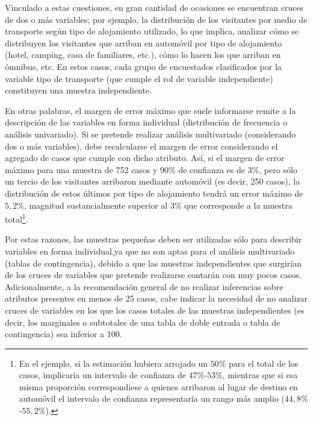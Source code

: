 \documentclass[
]{book}
\begin{document}
Vinculado a estas cuestiones, en gran cantidad de ocasiones se encuentran cruces de dos o más variables; por ejemplo, la distribución de los visitantes por medio de transporte según tipo de alojamiento utilizado, lo que implica, analizar cómo se distribuyen los visitantes que arriban en automóvil por tipo de alojamiento (hotel, camping, casa de familiares, etc.), cómo lo hacen los que arriban en ómnibus, etc. En estos casos, cada grupo de encuestados clasificados por la variable tipo de transporte (que cumple el rol de variable independiente) constituyen una muestra independiente.

En otras palabras, el margen de error máximo que suele informarse remite a la descripción de las variables en forma individual (distribución de frecuencia o análisis univariado). Si se pretende realizar análisis multivariado (considerando dos o más variables), debe recalcularse el margen de error considerando el agregado de casos que cumple con dicho atributo. Así, si el margen de error máximo para una muestra de 752 casos y \(90\%\) de confianza es de \(3\%\), pero sólo un tercio de los visitantes arribaron mediante automóvil (es decir, 250 casos), la distribución de estos últimos por tipo de alojamiento tendrá un error máximo de \(5,2\%\), magnitud sustancialmente superior al \(3\%\) que corresponde a la muestra total\footnote{En el ejemplo, si la estimación hubiera arrojado un \(50\%\) para el total de los casos, implicaría un intervalo de confianza de \(47\%\)-\(53\%\), mientras que si esa misma proporción correspondiese a quienes arribaron al lugar de destino en automóvil el intervalo de confianza representaría un rango más amplio (\(44,8\%\)-\(55,2\%\)).}.

Por estas razones, las muestras pequeñas deben ser utilizadas sólo para describir variables en forma individual,ya que no son aptas para el análisis multivariado (tablas de contingencia), debido a que las muestras independientes que surgirían de los cruces de variables que pretende realizarse contarán con muy pocos casos. Adicionalmente, a la recomendación general de no realizar inferencias sobre atributos presentes en menos de 25 casos, cabe indicar la necesidad de no analizar cruces de variables en los que los casos totales de las muestras independientes (es decir, los marginales o subtotales de una tabla de doble entrada o tabla de contingencia) sea inferior a 100.
\end{document}
